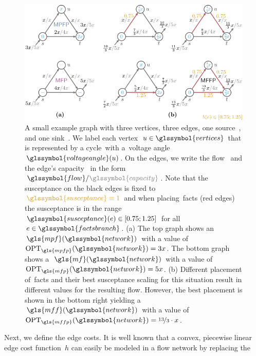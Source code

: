 %
\begin{figure}
    \includegraphics[page=1]{factsplacement/figures/MFF-minimal-example.pdf}
    \caption[The influence of susceptance scaling.]{A small example graph with
    three vertices, three edges, one source~\source, and one sink~\sink. We
    label each vertex~$\vertexa\in\glssymbol{vertices}$ that is represented by a
    cycle~\tikzVertex with a~\textcolor{THETA}{voltage
    angle~$\glssymbol{voltageangle}(\vertexa)$}. On the edges, we write the
    flow~ and the edge's capacity~ in the
    form~$\glssymbol{flow} / \textcolor{CAPACITY}{\glssymbol{capacity}}$. Note
    that the \textcolor{SUSCEPTANCE}{susceptance} on the black edges is fixed
    to~$\textcolor{SUSCEPTANCE}{\glssymbol{susceptance}\equiv 1}$ and when
    placing~\textcolor{ColorFACTSedge} {\gls{facts} (red edges)} the
    \textcolor{SUSCEPTANCE}{susceptance} is in the
    range~\textcolor{SUSCEPTANCE}{$\glssymbol{susceptance}(\edge)\in [0.75;
    1.25]$} for all~$\edge\in\glssymbol{factsbranch}$. (a) The top graph shows
    an~$\gls{mpf}(\glssymbol{network})$ with a value
    of~$\opt_{\gls{mpfp}}(\glssymbol{network}) = 3x$. The bottom graph shows
    a~$\gls{mf}(\glssymbol{network})$ with a value of~$\opt_{\gls{mfp}}
    (\glssymbol{network}) = 5x$. (b) Different placement of~\gls{facts} and
    their best \textcolor{SUSCEPTANCE}{susceptance scaling} for this situation
    result in different values for the resulting flow. However, the best
    placement is shown in the bottom right yielding
    a~$\gls{mff}(\glssymbol{network})$ with a value
    of~$\opt_{\gls{mffp}}(\glssymbol{network}) = \nicefrac{13}{3} \cdot x$.}
    \label{ch:facts:fig:MFF-minimal-example}
\end{figure}
% 
Next, we define the edge costs. It is well known that a convex, piecewise linear
edge cost function~$h$ can easily be modeled in a flow network by replacing the
